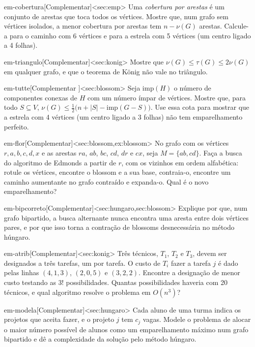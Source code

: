 \begin{exercicio}{em-cobertura}[Complementar]<sec:emp>
Uma \emph{cobertura por arestas} é um conjunto de arestas que toca todos os vértices. Mostre que, num grafo sem vértices isolados, a menor cobertura por arestas tem $n-\nu(G)$ arestas. Calcule-a para o caminho com 6 vértices e para a estrela com 5 vértices (um centro ligado a 4 folhas).
\end{exercicio}
\begin{exercicio}{em-triangulo}[Complementar]<sec:konig>
Mostre que $\nu(G)\le\tau(G)\le2\nu(G)$ em qualquer grafo, e que o teorema de König não vale no triângulo.
\end{exercicio}
\begin{exercicio}{em-tutte}[Complementar \estrela]<sec:blossom>
Seja $\mathrm{imp}(H)$ o número de componentes conexas de $H$ com um número ímpar de vértices. Mostre que, para todo $S\subseteq V$, $\nu(G)\le\frac12\bigl(n+|S|-\mathrm{imp}(G-S)\bigr)$. Use essa cota para mostrar que a estrela com 4 vértices (um centro ligado a 3 folhas) não tem emparelhamento perfeito.
\end{exercicio}
\begin{exercicio}{em-flor}[Complementar]<sec:blossom,ex:blossom>
No grafo com os vértices $r,a,b,c,d,x$ e as arestas $ra$, $ab$, $bc$, $cd$, $dr$ e $cx$, seja $M=\{ab,cd\}$. Faça a busca do algoritmo de Edmonds a partir de $r$, com os vizinhos em ordem alfabética: rotule os vértices, encontre o blossom e a sua base, contraia-o, encontre um caminho aumentante no grafo contraído e expanda-o. Qual é o novo emparelhamento?
\end{exercicio}
\begin{exercicio}{em-bipcorreto}[Complementar]<sec:hungaro,sec:blossom>
Explique por que, num grafo bipartido, a busca alternante nunca encontra uma aresta entre dois vértices pares, e por que isso torna a contração de blossoms desnecessária no método húngaro.
\end{exercicio}
\begin{exercicio}{em-atrib}[Complementar]<sec:konig>
Três técnicos, $T_1$, $T_2$ e $T_3$, devem ser designados a três tarefas, um por tarefa. O custo de $T_i$ fazer a tarefa $j$ é dado pelas linhas $(4,1,3)$, $(2,0,5)$ e $(3,2,2)$. Encontre a designação de menor custo testando as $3!$ possibilidades. Quantas possibilidades haveria com 20 técnicos, e qual algoritmo resolve o problema em $O(n^3)$?
\end{exercicio}
\begin{exercicio}{em-modela}[Complementar]<sec:hungaro>
Cada aluno de uma turma indica os projetos que aceita fazer, e o projeto $j$ tem $c_j$ vagas. Modele o problema de alocar o maior número possível de alunos como um emparelhamento máximo num grafo bipartido e dê a complexidade da solução pelo método húngaro.
\end{exercicio}
